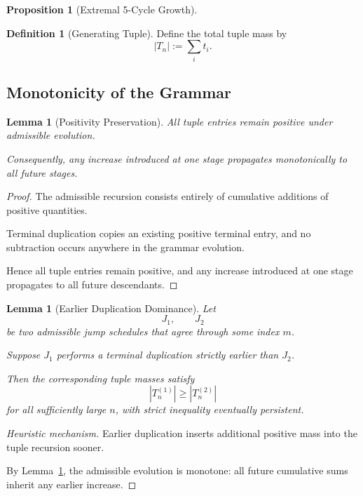 \documentclass[12pt, oneside]{article}
\numberwithin{equation}{section}
\theoremstyle{definition}
\newtheorem{definition}{Definition}[section]
\newtheorem{proposition}{Proposition}[section]
\theoremstyle{plain}
\newtheorem{lemma}[theorem]{Lemma}
\theoremstyle{remark}
\begin{document}
\begin{proposition}[Extremal 5-Cycle Growth]
\begin{definition}[Generating Tuple]
Define the total tuple mass by
\[
|T_n|:=\sum_i t_i.
\]
\end{definition}


\subsection{Monotonicity of the Grammar}


\begin{lemma}[Positivity Preservation]
\label{lem:positivity}
All tuple entries remain positive under admissible evolution.

Consequently, any increase introduced at one stage propagates
monotonically to all future stages.
\end{lemma}

\begin{proof}
The admissible recursion consists entirely of cumulative additions
of positive quantities.

Terminal duplication copies an existing positive terminal entry,
and no subtraction occurs anywhere in the grammar evolution.

Hence all tuple entries remain positive, and any increase introduced
at one stage propagates to all future descendants.
\end{proof}


\begin{lemma}[Earlier Duplication Dominance]
\label{lem:earlier-duplication}
Let
\[
J_1,\qquad J_2
\]
be two admissible jump schedules that agree through some index $m$.

Suppose $J_1$ performs a terminal duplication strictly earlier than
$J_2$.

Then the corresponding tuple masses satisfy
\[
|T_n^{(1)}|
\ge
|T_n^{(2)}|
\]
for all sufficiently large $n$, with strict inequality eventually
persistent.
\end{lemma}

\begin{proof}[Heuristic mechanism]
Earlier duplication inserts additional positive mass into the tuple
recursion sooner.

By Lemma~\ref{lem:positivity}, the admissible evolution is monotone:
all future cumulative sums inherit any earlier increase.


\end{proof}
\end{proposition}
\end{document}
